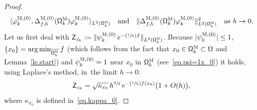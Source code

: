 \documentclass[JEP,XML,SOM,Unicode,NoEqCountersInSection,NoFloatCountersInSection,published]{cedram}
\newcommand{\Psfrac}[2]{(\sfrac{#1}{#2})}
\newcommand{\quand}{\quad\text{and}\quad}
\DeclareMathOperator*{\argmin}{arg\,min}
\theoremstyle{plain}
\theoremstyle{definition}
\begin{document}
\begin{proof}
\vspace*{-\baselineskip}
\[
\langle \varphi^{\textsc{M},(0)}_k,\Delta_{f,h}^{\textsc{M}, (0)}(\mathsf \Omega_k^{\textsc{M}}) \varphi^{\textsc{M},(0)}_k \rangle_{L^2(\mathsf \Omega_k^{\textsc{M}})}\quand\Vert \Delta_{f,h}^{\textsc{M}, (0)}(\mathsf \Omega_k^{\textsc{M}})\varphi^{\textsc{M},(0)}_k \Vert_{L^2(\mathsf \Omega_k^{\textsc{M}})}^2\quad\text{as $h\to 0$.}
\]
Let us first deal with $\mathsf Z_{z_k}:=\Vert \psi^{\textsc{M},(0)}_k\, e^{-\Psfrac 1hf} \Vert_{L^2(\mathsf \Omega_k^{\textsc{M}})} $. Because $|\psi^{\textsc{M},(0)}_k|\le 1$, $\{x_0\}= \argmin_{\overline{\mathsf \Omega_k^{\textsc{M}}}} f$ (which follows from the fact that $x_0\in \mathsf \Omega_k^{\textsc{M}} \subset \Omega$ and Lemma~\ref{le.start}) and $\psi^{\textsc{M},(0)}_k=1$ near $x_0$ in $\mathsf \Omega_k^{\textsc{M}}$ (see~\eqref{eq.psi=1x_0})
it holds, using Laplace's method, in~the limit $h\to 0$:
\begin{equation}\label{lap.x0K}
\mathsf Z_{z_k}= \sqrt{\kappa_{x_0}}\, h^{\sfrac d4}\, e^{-\Psfrac 1h f(x_0)} \bigl(1+O(h)\bigr),
\end{equation}
where $\kappa_{x_0}$ is defined in~\eqref{eq.kappa_0}.


\end{proof}
\end{document}
